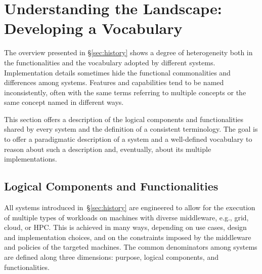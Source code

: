 \documentclass{sig-alternate}
\begin{document}

\newcommand{\vocab}[1]{\textbf{#1}\xspace}
\newcommand{\prop}[1]{\textit{#1}\xspace}
\newcommand{\impterm}[1]{\texttt{#1}\xspace}

\section{Understanding the Landscape: Developing a Vocabulary}
\label{sec:understanding}

The overview presented in \S\ref{sec:history} shows a degree of heterogeneity
both in the functionalities and the vocabulary adopted by different \pilotjob
systems. Implementation details sometimes hide the functional commonalities and
differences among \pilotjob systems. Features and capabilities tend to be named
inconsistently, often with the same terms referring to multiple concepts or the
same concept named in different ways.

This section offers a description of the logical components and functionalities
shared by every \pilotjob system and the definition of a consistent terminology.
The goal is to offer a paradigmatic description of a \pilotjob system and a
well-defined vocabulary to reason about such a description and, eventually,
about its multiple implementations.


\subsection{Logical Components and Functionalities}
\label{sec:compsandfuncs}

All \pilotjob systems introduced in~\S\ref{sec:history} are engineered to allow
for the execution of multiple types of workloads on machines with diverse
middleware, e.g., grid, cloud, or HPC. This is achieved in many ways, depending
on use cases, design and implementation choices, and on the constraints imposed
by the middleware and policies of the targeted machines. The common denominators
among \pilotjob systems are defined along three dimensions: purpose, logical
components, and functionalities.
\end{document}
